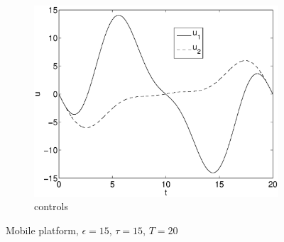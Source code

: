 \begin{figure}[h]
\begin{subfigure}[b]{\textwidth}
\centering
\includegraphics[height=0.3\textheight]{img/final_15_15_20_u.eps}
\caption{controls}
\end{subfigure}
\caption{Mobile platform, $\epsilon=15$, $\tau=15$, $T=20$}
\label{fig:pl4}
\end{figure}

